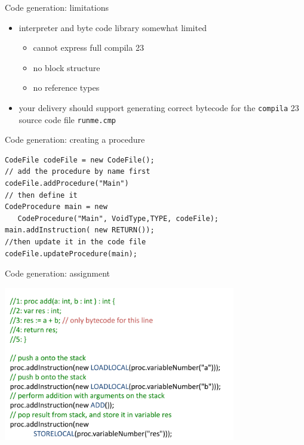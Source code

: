 \documentclass{beamer}
\begin{document}
\begin{frame}[label={sec:org7c99c4f},fragile]{Code generation: limitations}
 \begin{itemize}
\item interpreter and byte code library somewhat \alert{limited}
\begin{itemize}
\item cannot express full compila 23
\item no block structure
\item no reference types
\end{itemize}
\end{itemize}


\begin{itemize}
\item your delivery should support generating correct bytecode
for the \texttt{compila} 23 source code file \texttt{runme.cmp}
\end{itemize}
\end{frame}



\begin{frame}[label={sec:orgcbcf307},fragile,plain]{Code generation: creating a procedure}
 \lstset{language=java,label= ,caption= ,captionpos=b,numbers=none}
\begin{lstlisting}
CodeFile codeFile = new CodeFile();
// add the procedure by name first
codeFile.addProcedure("Main")
// then define it
CodeProcedure main = new 
   CodeProcedure("Main", VoidType,TYPE, codeFile);
main.addInstruction( new RETURN());
//then update it in the code file
codeFile.updateProcedure(main);
\end{lstlisting}
\end{frame}

\begin{frame}[label={sec:org16cec1d}]{Code generation: assignment}
\begin{center}
 \includegraphics[width=0.76\textwidth]{figures/snaps/codegen-assignment}
\end{center}
\end{frame}
\end{document}
